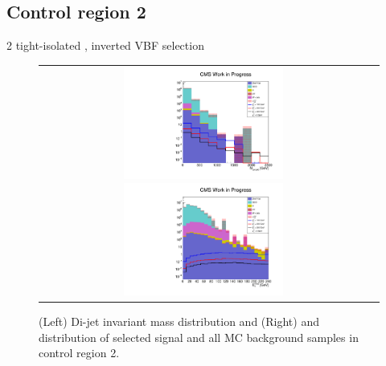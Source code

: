 \subsection*{Control region 2}

\FloatBarrier

2 tight-isolated \hadtau, inverted VBF selection

\begin{figure}[tbh!]
	\centering
	\begin{tabular}{cc}
		\includegraphics[width=0.5\textwidth]{analysis/pics/h_dijetinvariantmass_Tau2TightIsoVBFInverted.pdf}
		\includegraphics[width=0.5\textwidth]{analysis/pics/h_met_Tau2TightIsoVBFInverted.pdf} 		
	\end{tabular}
	\caption{(Left) Di-jet invariant mass distribution and (Right) and \met distribution of selected signal and all MC background samples in control region 2.}
	\label{fig::crplots1_Tau2TightIsoVBFInverted_13tev}
\end{figure}

